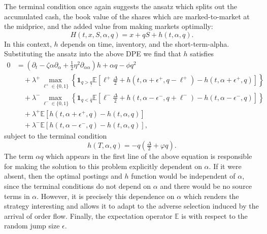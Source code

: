 \documentclass[11pt, a4paper]{book}
\newcommand{\E}{\mathbb{E}}
\newcommand{\Ind}{\mathbf{1}}
\begin{document}
	The terminal condition once again suggests the ansatz which splits out the accumulated cash, the book value of the shares which are marked-to-market at the midprice, and the added value from making markets optimally:
	\[
	H(t, x, S, \alpha, q) = x + q S + h(t, \alpha, q).
	\]
	In this context, $h$ depends on time, inventory, and the short-term-alpha. Substituting the ansatz into the above DPE we find that $h$ satisfies
	\begin{align*}
		0 &= \left( \partial_t - \zeta \alpha \partial_\alpha + \tfrac{1}{2}\eta^2 \partial_{\alpha \alpha} \right) h + \alpha q - \phi q^2 \\
		&\quad + \lambda^+ \max_{\ell^+ \in \{0,1\}} \left\{ \Ind_{q > \underline{q}} \E \left[ \ell^+ \tfrac{\Delta}{2} + h(t, \alpha + \epsilon^+, q - \ell^+) - h(t, \alpha + \epsilon^+, q) \right] \right\} \\
		&\quad + \lambda^- \max_{\ell^- \in \{0,1\}} \left\{ \Ind_{q < \bar{q}} \E \left[ \ell^- \tfrac{\Delta}{2} + h(t, \alpha - \epsilon^-, q + \ell^-) - h(t, \alpha - \epsilon^-, q) \right] \right\} \\
		&\quad + \lambda^+ \E \left[ h(t, \alpha + \epsilon^+, q) - h(t, \alpha, q) \right] \\
		&\quad + \lambda^- \E \left[ h(t, \alpha - \epsilon^-, q) - h(t, \alpha, q) \right],
	\end{align*}
	subject to the terminal condition
	\[
	h(T, \alpha, q) = -q \left(\tfrac{\Delta}{2} + \varphi q\right).
	\]
	The term $\alpha q$ which appears in the first line of the above equation is responsible for making the solution to this problem explicitly dependent on $\alpha$. If it were absent, then the optimal postings and $h$ function would be independent of $\alpha$, since the terminal conditions do not depend on $\alpha$ and there would be no source terms in $\alpha$. However, it is precisely this dependence on $\alpha$ which renders the strategy interesting and allows it to adapt to the adverse selection induced by the arrival of order flow. Finally, the expectation operator $\E$ is with respect to the random jump size $\epsilon$.
	
\end{document}
